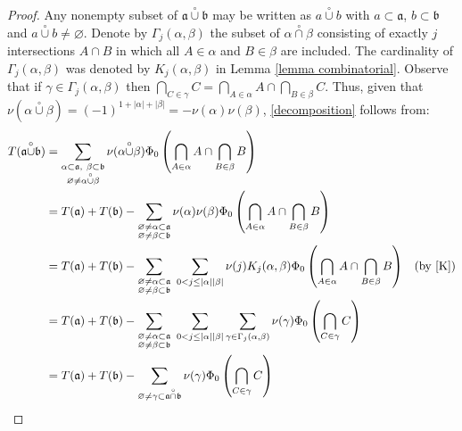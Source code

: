 \documentclass[11pt]{amsart}
\theoremstyle{plain}
\begin{document}
\begin{proof} 
Any nonempty subset of ${\mathfrak a}{\overset\circ\cup}{\mathfrak b}$ may be written as $a{\overset\circ\cup} b$ with $a\subset{\mathfrak a}$, 
$b\subset{\mathfrak b}$ and $a{\overset\circ\cup} b\ne{\varnothing}$. Denote by $\Gamma_j(\alpha,\beta)$ the subset 
of $\alpha{\overset\circ\cap}\beta$ consisting of exactly $j$ intersections $A\cap B$ in which all 
$A\in\alpha$ and $B\in\beta$ are included. The cardinality of $\Gamma_j(\alpha,\beta)$ 
was denoted by $K_j(\alpha,\beta)$ in Lemma \ref{lemma combinatorial}. Observe that 
if $\gamma\in\Gamma_j(\alpha,\beta)$ then 
$\bigcap_{C\in\gamma}C=\bigcap_{A\in\alpha}A\cap\bigcap_{B\in\beta}C$. 
Thus, given that $\nu(\alpha{\overset\circ\cup}\beta)=(-1)^{1+{\vert \alpha\vert}+{\vert \beta\vert}}=-\nu(\alpha)\nu(\beta)$, \eqref{decomposition} 
follows from:
\begin{align}\label{long}
\nonumber
T({\mathfrak a}{\overset\circ\cup}{\mathfrak b})
&=
\sum_{\substack{\alpha\subset{\mathfrak a},\ \beta\subset{\mathfrak b}\\{\varnothing}\ne\alpha{\overset\circ\cup}\beta}}
\nu(\alpha{\overset\circ\cup}\beta)\Phi_0\left(\bigcap_{A\in\alpha}A\cap\bigcap_{B\in\beta}B\right)
\\
\nonumber
&=
T({\mathfrak a})+T({\mathfrak b})
-\sum_{\substack{{\varnothing}\ne\alpha\subset{\mathfrak a}\\ {\varnothing}\ne\beta\subset{\mathfrak b}}}
\nu(\alpha)\nu(\beta)\Phi_0\left(\bigcap_{A\in\alpha}A\cap\bigcap_{B\in\beta}B\right)
\\
&=
T({\mathfrak a})+T({\mathfrak b})-
\sum_{\substack{{\varnothing}\ne\alpha\subset{\mathfrak a}\\ {\varnothing}\ne\beta\subset{\mathfrak b}}}\ 
\sum_{0<j\le{\vert \alpha\vert}{\vert \beta\vert}}\nu(j)
K_j(\alpha,\beta)\Phi_0\left(\bigcap_{A\in\alpha}A\cap\bigcap_{B\in\beta}B\right)
&(\text{by }\eqref{K})
\\
\nonumber
&=
T({\mathfrak a})+T({\mathfrak b})-
\sum_{\substack{{\varnothing}\ne\alpha\subset{\mathfrak a}\\ {\varnothing}\ne\beta\subset{\mathfrak b}}}\ 
\sum_{0<j\le{\vert \alpha\vert}{\vert \beta\vert}}
\sum_{\gamma\in\Gamma_j(\alpha,\beta)}
\nu(\gamma)\Phi_0\left(\bigcap_{C\in\gamma}C\right)\\
\nonumber
&=
T({\mathfrak a})+T({\mathfrak b})-
\sum_{{\varnothing}\ne\gamma\subset{\mathfrak a}{\overset\circ\cap}{\mathfrak b}}\nu(\gamma)\Phi_0\left(\bigcap_{C\in\gamma}C\right)\\

\end{align}
\end{proof}
\end{document}
